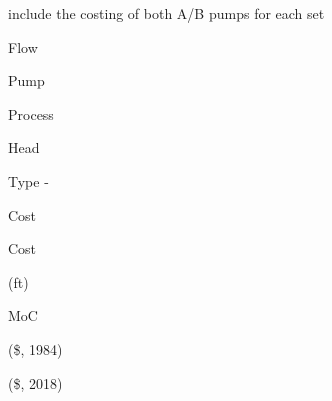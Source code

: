\documentclass[a4paper,portrait,12pt]{article}
\begin{document}
\begin{flushleft}
include the costing of both A/B pumps for each set
\end{flushleft}





\begin{flushleft}
Flow
\end{flushleft}


\begin{flushleft}
Pump
\end{flushleft}





\begin{flushleft}
Process
\end{flushleft}





\begin{flushleft}
Head
\end{flushleft}





\begin{flushleft}
Type -
\end{flushleft}





\begin{flushleft}
Cost
\end{flushleft}





\begin{flushleft}
Cost
\end{flushleft}





\begin{flushleft}
(ft)
\end{flushleft}





\begin{flushleft}
MoC
\end{flushleft}





(\$, 1984)





(\$, 2018)
\end{document}
